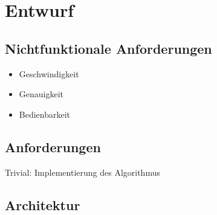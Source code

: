 \chapter{Entwurf}

\section{Nichtfunktionale Anforderungen}

\begin{itemize}
    \item Geschwindigkeit
    \item Genauigkeit
    \item Bedienbarkeit
\end{itemize}

\section{Anforderungen}

Trivial: Implementierung des Algorithmus

\section{Architektur}

